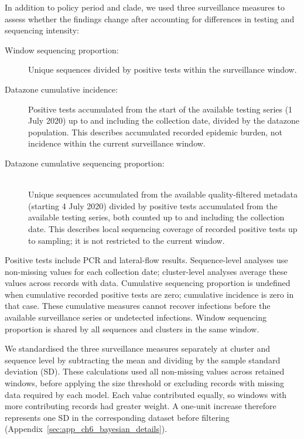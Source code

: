 In addition to policy period and clade, we used three surveillance measures to assess whether the findings change after accounting for differences in testing and sequencing intensity:

\begin{description}
    \item[Window sequencing proportion:] Unique sequences divided by positive tests within the surveillance window.
    \item[Datazone cumulative incidence:] Positive tests accumulated from the start of the available testing series (1 July 2020) up to and including the collection date, divided by the datazone population. This describes accumulated recorded epidemic burden, not incidence within the current surveillance window.
    \item[Datazone cumulative sequencing proportion:] \mbox{}\\
    Unique sequences accumulated from the available quality-filtered metadata (starting 4 July 2020) divided by positive tests accumulated from the available testing series, both counted up to and including the collection date. This describes local sequencing coverage of recorded positive tests up to sampling; it is not restricted to the current window.
\end{description}

Positive tests include PCR and lateral-flow results. Sequence-level analyses use non-missing values for each collection date; cluster-level analyses average these values across records with data. Cumulative sequencing proportion is undefined when cumulative recorded positive tests are zero; cumulative incidence is zero in that case. These cumulative measures cannot recover infections before the available surveillance series or undetected infections. Window sequencing proportion is shared by all sequences and clusters in the same window.

We standardised the three surveillance measures separately at cluster and sequence level by subtracting the mean and dividing by the sample standard deviation (SD). These calculations used all non-missing values across retained windows, before applying the size threshold or excluding records with missing data required by each model. Each value contributed equally, so windows with more contributing records had greater weight. A one-unit increase therefore represents one SD in the corresponding dataset before filtering (Appendix~\ref{sec:app_ch6_bayesian_details}).

